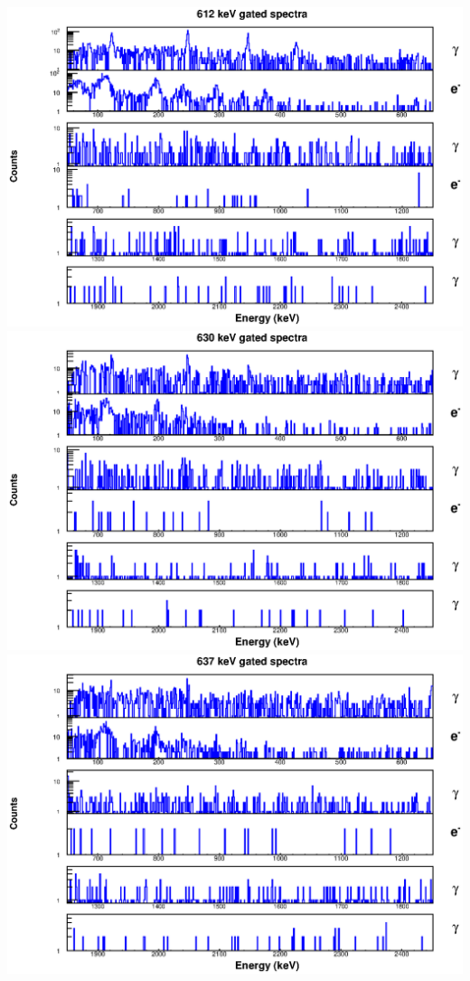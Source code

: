 \includegraphics[scale=0.8]{154Gd_Appendix/612_combined.eps}
\includegraphics[scale=0.8]{154Gd_Appendix/630_combined.eps}
\includegraphics[scale=0.8]{154Gd_Appendix/637_combined.eps}
